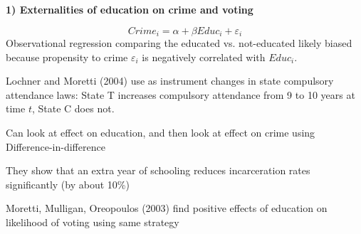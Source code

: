 \documentclass[landscape]{slides}
\begin{document}
\begin{slide}
\begin{center}
{\bf 1) Externalities of education on crime and voting}
\end{center}
\[ Crime_i= \alpha + \beta Educ_i + \varepsilon_i \]
Observational regression comparing
the educated vs. not-educated likely biased 
because propensity to crime $\varepsilon_i$ is negatively correlated with $Educ_i$.

Lochner and Moretti (2004) use as instrument changes in state compulsory attendance laws:
State T increases compulsory attendance from 9 to 10 years at time $t$, State C does not.

Can look at effect on education, and then look at effect on crime using Difference-in-difference

They show that an extra year of schooling reduces incarceration rates significantly (by about 10\%)





Moretti, Mulligan, Oreopoulos (2003) find positive effects of education on likelihood of voting using same strategy

\end{slide}
\end{document}
